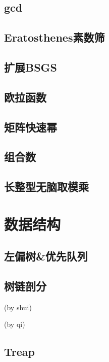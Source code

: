 \documentclass{ctexart}
\begin{document}
\subsection{gcd}

\subsection{Eratosthenes素数筛}

\subsection{扩展BSGS}

\subsection{欧拉函数}

\subsection{矩阵快速幂}

\subsection{组合数}

\subsection{长整型无脑取模乘}






\section{数据结构}
\subsection{左偏树\&优先队列} %

\subsection{树链剖分}
(by shui)

(by qi)

\subsection{Treap}



\end{document}
